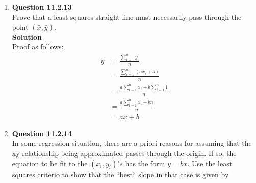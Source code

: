 \documentclass{uofa-eng-assignment}
\begin{document}
\begin{enumerate}
    \item[]
        \textbf{Question 11.2.13} \\
        Prove that a least squares straight line must necessarily pass through the point $(\bar{x}, \bar{y})$. \\
        \textbf{Solution} \\
        Proof as follows:
        \begin{align*}
            \bar{y} & = \frac{\sum_{i=1}^{n}y_i}{n}                     \\
                    & = \frac{\sum_{i=1}^{n}(ax_i + b)}{n}              \\
                    & = \frac{a\sum_{i=1}^{n}x_i + b\sum_{i=1}^{n}1}{n} \\
                    & = \frac{a\sum_{i=1}^{n}x_i + bn}{n}               \\
                    & = a\bar{x} + b
        \end{align*}
    \item[]
        \textbf{Question 11.2.14} \\
        In some regression situation, there are a priori reasons for assuming that
        the xy-relationship being approximated passes through the origin.
        If so, the equation to be fit to the $(x_i, y_i)'s$ has the form $y = bx$.
        Use the least squares criterio to show that the ``best`` slope in that case is given by
        \begin{align*}

\end{align*}
\end{enumerate}
\end{document}
